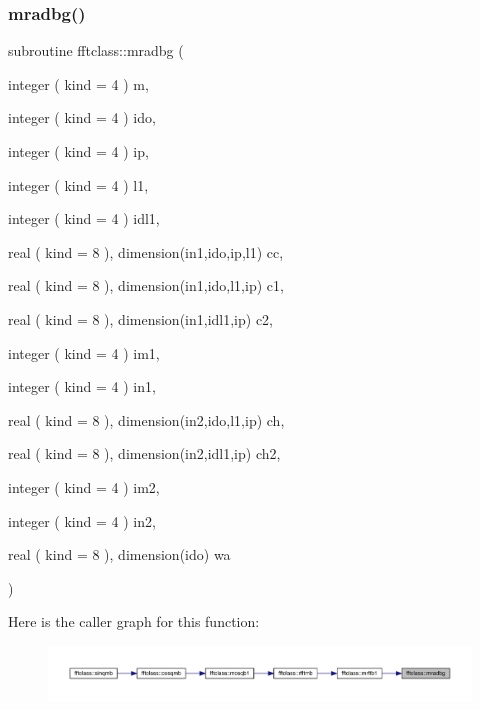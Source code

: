 \subsubsection{\texorpdfstring{mradbg()}{mradbg()}}
{\footnotesize\ttfamily subroutine fftclass\+::mradbg (\begin{DoxyParamCaption}\item[{integer ( kind = 4 )}]{m,  }\item[{integer ( kind = 4 )}]{ido,  }\item[{integer ( kind = 4 )}]{ip,  }\item[{integer ( kind = 4 )}]{l1,  }\item[{integer ( kind = 4 )}]{idl1,  }\item[{real ( kind = 8 ), dimension(in1,ido,ip,l1)}]{cc,  }\item[{real ( kind = 8 ), dimension(in1,ido,l1,ip)}]{c1,  }\item[{real ( kind = 8 ), dimension(in1,idl1,ip)}]{c2,  }\item[{integer ( kind = 4 )}]{im1,  }\item[{integer ( kind = 4 )}]{in1,  }\item[{real ( kind = 8 ), dimension(in2,ido,l1,ip)}]{ch,  }\item[{real ( kind = 8 ), dimension(in2,idl1,ip)}]{ch2,  }\item[{integer ( kind = 4 )}]{im2,  }\item[{integer ( kind = 4 )}]{in2,  }\item[{real ( kind = 8 ), dimension(ido)}]{wa }\end{DoxyParamCaption})}

Here is the caller graph for this function\+:\nopagebreak
\begin{figure}[H]
\begin{center}
\leavevmode
\includegraphics[width=350pt]{namespacefftclass_ae156d4969bbcc9250a0dc81ee91d3cdf_icgraph}
\end{center}
\end{figure}
\mbox{\label{namespacefftclass_a577b893eadc27ccc53b888490cb1b873}} 
